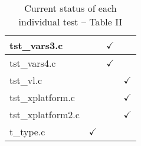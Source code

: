 \begin{table}[H]
\begin{tabular}{|l|c|c|c|}
tst\_vars3.c            &               & $\checkmark$  &               \\ \hline
tst\_vars4.c            &               & $\checkmark$  &               \\ \hline
tst\_vl.c               &               &               & $\checkmark$  \\ \hline
tst\_xplatform.c        &               &               & $\checkmark$  \\ \hline
tst\_xplatform2.c       &               &               & $\checkmark$  \\ \hline
t\_type.c               & $\checkmark$  &               &               \\ \hline
\hline
\end{tabular}
\caption{\label{tab:nc_test4_status_2} Current status of each individual test -- Table II}
\end{table}
